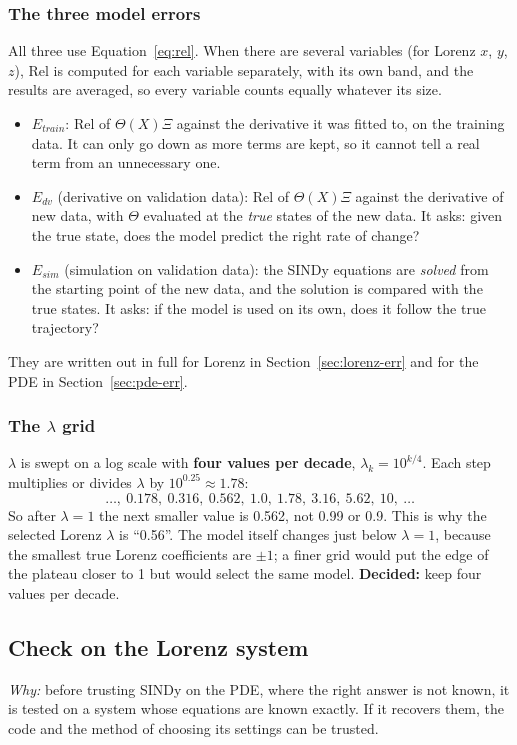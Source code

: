 \documentclass[11pt,a4paper]{article}
\newcommand{\why}{\textit{Why:} }
\newcommand{\decided}[1]{\textcolor{green!40!black}{\textbf{Decided:} #1}}
\begin{document}
\subsubsection{The three model errors}
All three use Equation~\eqref{eq:rel}. When there are several variables (for Lorenz $x$, $y$, $z$), Rel is computed for each variable separately, with its own band, and the results are averaged, so every variable counts equally whatever its size.
\begin{itemize}
  \item $E_{train}$: Rel of $\Theta(X)\Xi$ against the derivative it was fitted to, on the training data. It can only go down as more terms are kept, so it cannot tell a real term from an unnecessary one.
  \item $E_{dv}$ (derivative on validation data): Rel of $\Theta(X)\Xi$ against the derivative of new data, with $\Theta$ evaluated at the \emph{true} states of the new data. It asks: given the true state, does the model predict the right rate of change?
  \item $E_{sim}$ (simulation on validation data): the SINDy equations are \emph{solved} from the starting point of the new data, and the solution is compared with the true states. It asks: if the model is used on its own, does it follow the true trajectory?
\end{itemize}
They are written out in full for Lorenz in Section~\ref{sec:lorenz-err} and for the PDE in Section~\ref{sec:pde-err}.

\subsubsection{The $\lambda$ grid}\label{sec:grid}
$\lambda$ is swept on a log scale with \textbf{four values per decade}, $\lambda_k=10^{k/4}$. Each step multiplies or divides $\lambda$ by $10^{0.25}\approx1.78$:
\[
  \dots,\ 0.178,\ 0.316,\ 0.562,\ 1.0,\ 1.78,\ 3.16,\ 5.62,\ 10,\ \dots
\]
So after $\lambda=1$ the next smaller value is 0.562, not 0.99 or 0.9. This is why the selected Lorenz $\lambda$ is ``0.56''. The model itself changes just below $\lambda=1$, because the smallest true Lorenz coefficients are $\pm1$; a finer grid would put the edge of the plateau closer to 1 but would select the same model.
\decided{keep four values per decade.}

\subsection{Check on the Lorenz system}
\why before trusting SINDy on the PDE, where the right answer is not known, it is tested on a system whose equations are known exactly. If it recovers them, the code and the method of choosing its settings can be trusted.
\end{document}
